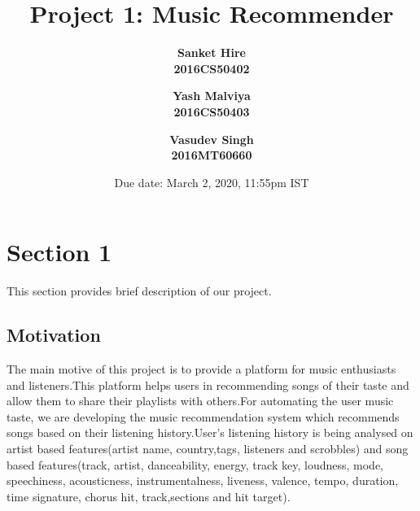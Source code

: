 \documentclass[10pt]{article}
\title{\textbf{Project 1: Music Recommender}}
\author{\textbf{Sanket Hire} \\ \textbf{2016CS50402} \and \textbf{Yash Malviya} \\ \textbf{2016CS50403} \and \textbf{Vasudev Singh} \\ \textbf{2016MT60660}}
\date{Due date: March 2, 2020, 11:55pm IST}
\begin{document}
\maketitle

\section{Section 1}
This section provides brief description of our project.
\subsection{Motivation}
The main motive of this project is to provide a platform for music enthusiasts and listeners.This platform helps users in recommending songs of their taste and allow them to share their playlists with others.For automating the user music taste, we are developing the music recommendation system which recommends songs based on their listening history.User's listening history is being analysed on artist based features(artist name,  country,tags, listeners and scrobbles) and song based features(track, artist, danceability, energy, track key, loudness, mode, speechiness, acousticness,  instrumentalness,  liveness,  valence,  tempo,  duration,  time  signature,  chorus  hit,  track,sections and hit target). 


\end{document}

